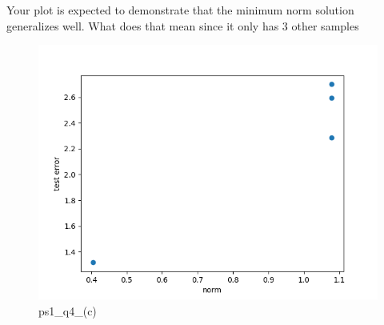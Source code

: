 
\begin{answer}

Your plot is expected to demonstrate that the minimum norm solution
generalizes well. What does that mean since it only has 3 other samples 
\begin{figure}[H]
    \centering
    \includegraphics[width=0.5\linewidth]{ps1_q4_(c).png}
    \caption{ps1\_q4\_(c)}
    \label{fig:enter-label}
\end{figure}
\end{answer}